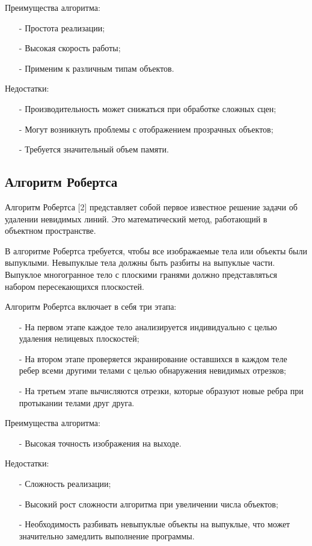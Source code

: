 Преимущества алгоритма:
\begin{itemize}[label=\arabic*)]
	\item[-] Простота реализации;
	\item[-] Высокая скорость работы;
	\item[-] Применим к различным типам объектов.
\end{itemize}

Недостатки:
\begin{itemize}[label=\arabic*)]
	\item[-] Производительность может снижаться при обработке сложных сцен;
	\item[-] Могут возникнуть проблемы с отображением прозрачных объектов;
	\item[-] Требуется значительный объем памяти.
\end{itemize}

\subsection{Алгоритм Робертса}

Алгоритм Робертса [2] представляет собой первое известное решение задачи об удалении невидимых линий. Это математический метод, работающий в объектном пространстве.

В алгоритме Робертса требуется, чтобы все изображаемые тела или объекты были выпуклыми. Невыпуклые тела должны быть разбиты на выпуклые части. Выпуклое многогранное тело с плоскими гранями должно представляться набором пересекающихся плоскостей.

Алгоритм Робертса включает в себя три этапа:
\begin{itemize}[label=\arabic*)]
	\item[-] На первом этапе каждое тело анализируется индивидуально с целью удаления нелицевых плоскостей;
	\item[-] На втором этапе проверяется экранирование оставшихся в каждом теле ребер всеми другими телами с целью обнаружения невидимых отрезков;
	\item[-] На третьем этапе вычисляются отрезки, которые образуют новые ребра при протыкании телами друг друга.
\end{itemize}

Преимущества алгоритма:
\begin{itemize}[label=\arabic*)]
	\item[-] Высокая точность изображения на выходе.
\end{itemize}
Недостатки:
\begin{itemize}[label=\arabic*)]
	\item[-] Сложность реализации;
	\item[-] Высокий рост сложности алгоритма при увеличении числа объектов;
	\item[-] Необходимость разбивать невыпуклые объекты на выпуклые, что может значительно замедлить выполнение программы.
\end{itemize}

